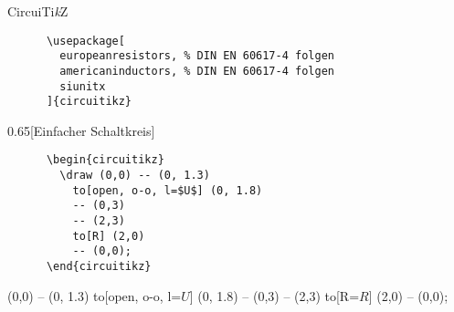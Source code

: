 \begin{frame}[fragile]{%
  CircuiTi\textit{k}Z
  \hfill
}
  \begin{Packages}
    \begin{verbatim}
      \usepackage[
        europeanresistors, % DIN EN 60617-4 folgen
        americaninductors, % DIN EN 60617-4 folgen
        siunitx
      ]{circuitikz}
    \end{verbatim}
  \end{Packages}
  \begin{CodeExample}{0.65}[Einfacher Schaltkreis]
    \begin{verbatim}
      \begin{circuitikz}
        \draw (0,0) -- (0, 1.3)
          to[open, o-o, l=$U$] (0, 1.8)
          -- (0,3)
          -- (2,3)
          to[R] (2,0)
          -- (0,0);
      \end{circuitikz}
    \end{verbatim}
  \CodeResult
    \begin{circuitikz}
      \draw (0,0) -- (0, 1.3)
          to[open, o-o, l=$U$] (0, 1.8)
          -- (0,3) -- (2,3)
          to[R=$R$] (2,0)
          -- (0,0);
      \end{circuitikz}
  \end{CodeExample}
\end{frame}


